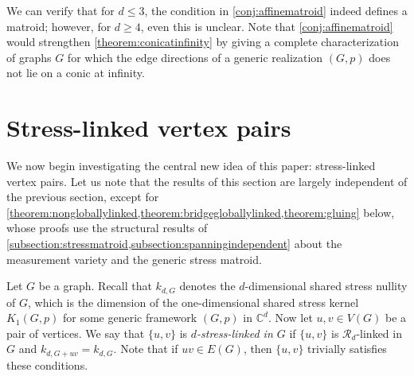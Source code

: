 \documentclass[11pt,a4paper,dvipsnames]{scrartcl}
\theoremstyle{definition}
\newcommand{\CC}{\mathbb{C}}
\newcommand{\stressnullity}[1]{k_{d, #1}}
\newcommand{\strongly}[1]{${#1}$-stress-linked}
\begin{document}
We can verify that for $d \leq 3$, the condition in \cref{conj:affinematroid} indeed defines a matroid; however, for $d \geq 4$, even this is unclear.
Note that \cref{conj:affinematroid} would strengthen \cref{theorem:conicatinfinity} by giving a complete characterization of graphs $G$ for which the edge directions of a generic realization $(G,p)$ does not lie on a conic at infinity.



\section{Stress-linked vertex pairs}\label{section:globallylinked}


We now begin investigating the central new idea of this paper: stress-linked vertex pairs. %
Let us note that the results of this section are largely independent of the previous section, except for \cref{theorem:nongloballylinked,theorem:bridgegloballylinked,theorem:gluing} below, whose proofs use the structural results of \cref{subsection:stressmatroid,subsection:spanningindependent} about the measurement variety and the generic stress matroid.

Let $G$ be a graph. Recall that $\stressnullity{G}$ denotes the $d$-dimensional shared stress nullity of $G$, which is the dimension of the one-dimensional shared stress kernel $K_1(G,p)$ for some generic framework $(G,p)$ in $\CC^d$. 
Now let $u,v \in V(G)$ be a pair of vertices. 
We say that $\{u,v\}$ is \emph{\strongly{d} in $G$} if $\{u,v\}$ is $\mathcal{R}_d$-linked in $G$ and $\stressnullity{G+uv} = \stressnullity{G}$. Note that if $uv \in E(G)$, then $\{u,v\}$ trivially satisfies these conditions. 
\end{document}
